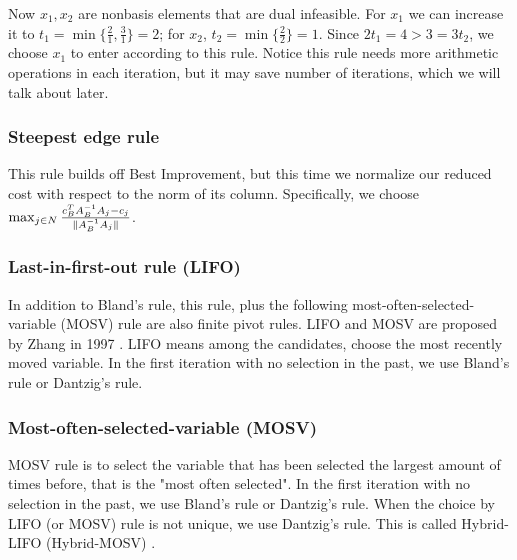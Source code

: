 \documentclass[11pt]{article}
\begin{document}
Now $x_1, x_2$ are nonbasis elements that are dual infeasible. For $x_1$ we can increase it to $t_1 = \min \{\frac{2}{1}, \frac{3}{1}\} = 2$; for $x_2$, $t_2 = \min \{\frac{2}{2}\} = 1$. Since $2t_1 = 4 > 3 = 3t_2$, we choose $x_1$ to enter according to this rule. Notice this rule needs more arithmetic operations in each iteration, but it may save number of iterations, which we will talk about later.

\subsubsection{Steepest edge rule}
This rule builds off Best Improvement, but this time we normalize our reduced cost with respect to the norm of its column. Specifically, we choose $\max_{j \in N} \frac{c_B^TA_B^{-1}A_j - c_j}{\lVert A_B^{-1}A_j\rVert}$.

\subsubsection{Last-in-first-out rule (LIFO)}
In addition to Bland's rule, this rule, plus the following most-often-selected-variable (MOSV) rule are also finite pivot rules. LIFO and MOSV are proposed by Zhang in 1997 \cite{zhang1999new}. LIFO means among the candidates, choose the most recently moved variable. In the first iteration with no selection in the past, we use Bland's rule or Dantzig's rule.

\subsubsection{Most-often-selected-variable (MOSV)}
MOSV rule is to select the variable that has been selected the largest amount of times before, that is the "most often selected". In the first iteration with no selection in the past, we use Bland's rule or Dantzig's rule. When the choice by LIFO (or MOSV) rule is not unique, we use Dantzig's rule. This is called Hybrid-LIFO (Hybrid-MOSV) \cite{zhang1999new}.
\end{document}

